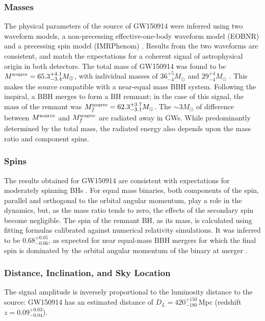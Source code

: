 \documentclass[binding=0.6cm, LaM]{sapthesis}
\begin{document}
	\subsubsection{Masses}
	The physical parameters of the source of GW150914 were inferred using two waveform models, a non-precessing effective-one-body waveform model (EOBNR) \cite{103, 104} 
	and a precessing spin model (IMRPhenom) \cite{105-107}. 
	Results from the two waveforms are consistent, and match the expectations for a coherent signal of astrophysical origin in both detectors. 
	The total mass of GW150914 was found to be $M^{\rm source} = 65.3^{+4.1}_{-3.4}M_\odot$, with individual masses of $36^{+5}_{-4}M_\odot$ and $29^{+4}_{-4}M_\odot$ \cite{21,41,51}.  This makes the source compatible with a near-equal mass BBH system.
	Following the inspiral, a BBH merges to form a BH remnant; in the case of this signal, the mass of the remnant was $M^{\rm source}_f = 62.3^{+3.7}_{-3.1}M_\odot$.
	The $\sim 3M_\odot$ of difference between $M^{\rm source}$ and $M^{\rm source}_f$ are radiated away in GWs.  While predominantly determined by the total mass, the radiated energy also depends upon the mass ratio and component spins.

	\subsubsection{Spins}
	The results obtained for GW150914 are consistent with expectations for moderately spinning BHs \cite{101, 102}. 
	For equal mass binaries, both components of the spin, 
	parallel and orthogonal to the orbital angular momentum, 
	play a role in the dynamics, but, as the mass ratio tends to zero, 
	the effects of the secondary spin become negligible.
	The spin of the remnant BH, as its mass, is calculated using fitting formulas calibrated against numerical relativity simulations.  It was inferred to be $0.68^{+0.05}_{-0.06}$, as expected for near equal-mass BBH mergers for which the final spin is dominated by the orbital angular momentum of the binary at merger \cite{99, 100}.

	\subsubsection{Distance, Inclination, and Sky Location}
	The signal amplitude is inversely proportional to the luminosity distance to the source: 
	GW150914 has an estimated distance of $D_L = 420^{+150}_{-180}\,$Mpc (redshift $z=0.09^{+0.03}_{-0.04}$). 
\end{document}
